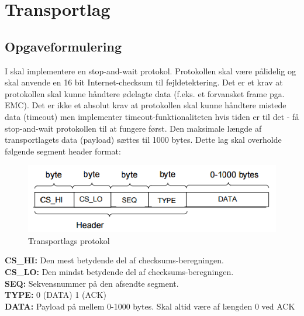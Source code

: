 \chapter{Transportlag}

\section{Opgaveformulering}
I skal implementere en stop-and-wait protokol. Protokollen skal være pålidelig og skal anvende en 16 bit Internet-checksum til
fejldetektering. Det er et krav at protokollen skal kunne håndtere ødelagte data (f.eks. et forvansket frame pga. EMC). Det er ikke et absolut krav at protokollen skal kunne håndtere mistede data (timeout) men implementer timeout-funktionaliteten hvis tiden er til det - få stop-and-wait protokollen til at fungere først. Den maksimale længde af transportlagets data (payload) sættes til 1000 bytes. Dette lag skal overholde følgende segment header format:

\begin{figure}[htbp]
\centering
\includegraphics[width=1\linewidth]{Subpages/Billeder/Transportlag}
\caption{Transportlags protokol}
\label{fig:Transportlag}
\end{figure}

\textbf{CS\_HI:} Den mest betydende del af checksums-beregningen.\\
\textbf{CS\_LO:} Den mindst betydende del af checksums-beregningen.\\
\textbf{SEQ:} Sekvensnummer på den afsendte segment.\\
\textbf{TYPE:} 0 (DATA) 1 (ACK)\\
\textbf{DATA:} Payload på mellem 0-1000 bytes. Skal altid være af længden 0 ved ACK

